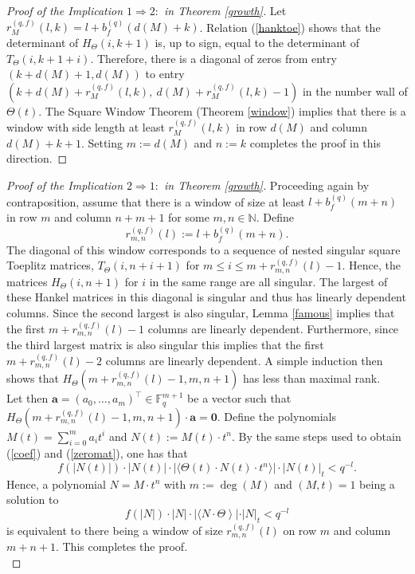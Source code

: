 \documentclass{article}
\theoremstyle{definition}
\newcommand{\N}{\mathbb{N}}
\newcommand{\F}{\mathbb{F}}
\numberwithin{equation}{subsection}
\begin{document}
\begin{proof}[Proof of the Implication $1\Rightarrow2:$ in Theorem \ref{growth}]
\noindent Let $r_M^{(q,f)}(l,k)=l+b_f^{(q)}(d(M)+k)$. Relation (\ref{hanktoe}) shows that the determinant of $H_\Theta(i, k+1)$ is, up to sign, equal to the determinant of $T_\Theta(i,k+1+i)$. Therefore, there is a diagonal of zeros from entry $(k+d(M)+1,d(M))$ to entry $(k+d(M)+r_M^{(q,f)}(l,k),~d(M)+r_M^{(q,f)}(l,k)-1)$ in the number wall of $\Theta(t)$. The Square Window Theorem (Theorem \ref{window}) implies that there is a window with side length at least $r^{(q,f)}_{M}(l,k)$ in row $d(M)$ and column $d(M)+k+1$. Setting $m:=d(M)$ and $n:=k$ completes the proof in this direction.\end{proof}
\begin{proof}[Proof of the Implication $2\Rightarrow1:$ in Theorem \ref{growth}]
\noindent Proceeding again by contraposition, assume that there is a window of size at least $l+b_f^{(q)}(m+n)$ in row $m$ and column $n+m+1$ for some $m,n\in\N$. Define $$r^{(q,f)}_{m,n}(l):=l+b_f^{(q)}(m+n).$$ The diagonal of this window corresponds to a sequence of nested singular square Toeplitz matrices, $T_\Theta(i, n+i+1)$ for $m\le i \le m+r^{(q,f)}_{m,n}(l)-1$. Hence, the matrices $H_\Theta(i,n+1)$ for $i$ in the same range are all singular. The largest of these Hankel matrices in this diagonal is singular and thus has linearly dependent columns. Since the second largest is also singular, Lemma \ref{famous} implies that the first $m+r^{(q,f)}_{m,n}(l)-1$ columns are linearly dependent. Furthermore, since the third largest matrix is also singular this implies that the first $m+r^{(q,f)}_{m,n}(l)-2$ columns are linearly dependent. A simple induction then shows that $H_\Theta(m+r^{(q,f)}_{m,n}(l)-1, m, n+1)$ has less than maximal rank. \\
    
\noindent Let then $\mathbf{a}=(a_0,\dots,a_m)^\top\in\F_q^{m+1}$ be a vector such that $H_\Theta(m+r^{(q,f)}_{m,n}(l)-1, m,n+1)\cdot \mathbf{a}=\mathbf{0}$. Define the polynomials $M(t)=\sum_{i=0}^ma_it^i$ and $N(t):=M(t)\cdot t^n$. By the same steps used to obtain (\ref{coef}) and (\ref{zeromat}), one has that \[f(|N(t)|)\cdot |N(t)|\cdot|\langle\Theta(t)\cdot N(t) \cdot t^n\rangle|\cdot |N(t)|_t<q^{-l}.\]
    \noindent Hence, a polynomial $N=M\cdot t^n$ with $m:=\deg(M)$ and $(M,t)=1$ being a solution to \[f(|N|)\cdot|N|\cdot\left|\langle N\cdot\Theta\right\rangle|\cdot|N|_t<q^{-l}\] is equivalent to there being a window of size $r^{(q,f)}_{m,n}(l)$ on row $m$ and column $m+n+1$. This completes the proof. \\
\end{proof}
\end{document}
